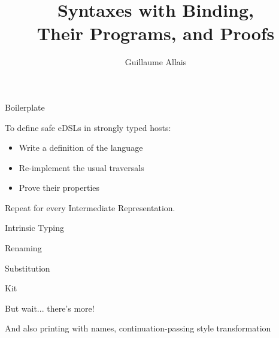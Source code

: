 \documentclass{beamer}
\title{Syntaxes with Binding,\\ Their Programs, and Proofs}
\author{Guillaume Allais}
\institute{University of Strathclyde}
\begin{document}
\maketitle

\begin{frame}{Boilerplate}

  To define safe eDSLs in strongly typed hosts:

  \bigskip

  \begin{itemize}
    \item Write a definition of the language
    \item Re-implement the usual traversals
    \item Prove their properties
  \end{itemize}

  \vfill

  Repeat for every Intermediate Representation.

\end{frame}

\begin{frame}{Intrinsic Typing}
  \vfill
\end{frame}

\begin{frame}{Renaming}
\end{frame}

\begin{frame}{Substitution}
\end{frame}

\begin{frame}{Kit}
  \vfill
\end{frame}


\begin{frame}{But wait... there's more!}

  \vfill

  And also printing with names,
  continuation-passing style transformation
\end{frame}
\end{document}
